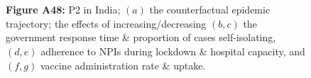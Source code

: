 \documentclass[paper=a4,fontsize=11pt]{article}
\begin{document}
\begin{figure}[!h]
  \\
  \hspace{1.76cm}
  \\
  \caption*{\textbf{Figure A48:} P2 in India; $(a)$ the counterfactual epidemic trajectory; the effects of increasing/decreasing $(b,c)$ the government response time \& proportion of cases self-isolating, $(d,e)$ adherence to NPIs during lockdown \& hospital capacity, and $(f,g)$ vaccine administration rate \& uptake.}
\end{figure}
\end{document}
